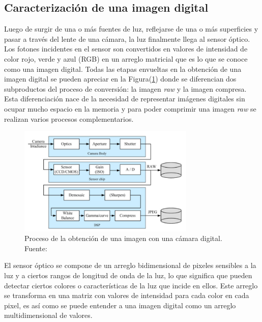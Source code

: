     \subsection{Caracterización de una imagen digital}
    Luego de surgir de una o más fuentes de luz, reflejarse de una o más superficies y pasar a través del lente de una cámara, 
    la luz finalmente llega al sensor óptico. Los fotones incidentes en el sensor son convertidos en valores de intensidad de 
    color rojo, verde y azul (RGB) en un arreglo matricial que es lo que se conoce como una imagen digital. Todas las etapas 
    envueltas en la obtención de una imagen digital se pueden apreciar en la Figura(\ref{fig:digitalcam}) donde se diferencian 
    dos subproductos del proceso de conversión: la imagen \textit{raw} y la imagen compresa. Esta diferenciación nace de la 
    necesidad de representar imágenes digitales sin ocupar mucho espacio en la memoria y para poder comprimir una imagen 
    \textit{raw} se realizan varios procesos complementarios.

    \begin{figure}[!h] 
        \centering
        \includegraphics[width=0.75\textwidth]{img/digitalcam}
        \caption[Obtención de una imagen con una cámara digital]{Proceso de la obtención de una imagen con una cámara digital. Fuente: \cite{Szeliski2011} }
        \label{fig:digitalcam}
    \end{figure}

    El sensor óptico se compone de un arreglo bidimensional de pixeles sensibles a la luz y a ciertos rangos de longitud de onda de 
    la luz, lo que significa que pueden detectar ciertos colores o características de la luz que incide en ellos. Este arreglo 
    se transforma en una matriz con valores de intensidad para cada color en cada pixel, es así como se puede entender 
    a una imagen digital como un arreglo multidimensional de valores. 

